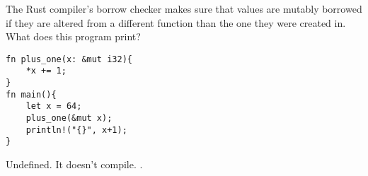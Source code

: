 %
%
The Rust compiler's borrow checker makes sure that values are mutably borrowed if they are altered from a different function than the one they were created in. What does this program print?
\begin{lstlisting}
fn plus_one(x: &mut i32){
    *x += 1;
}
fn main(){
    let x = 64;
    plus_one(&mut x);
    println!("{}", x+1);
}
\end{lstlisting}
  \choice Undefined.
  \choice It doesn't compile.
  .
